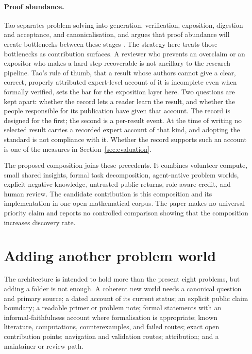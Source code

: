 \documentclass[10pt]{article}
\begin{document}
\paragraph{Proof abundance.}
Tao separates problem solving into generation, verification, exposition,
digestion and acceptance, and canonicalisation, and argues that proof
abundance will create bottlenecks between these stages \cite{tao2026}.  The
strategy here treats those bottlenecks as contribution surfaces.  A reviewer
who prevents an overclaim or an expositor who makes a hard step recoverable is
not ancillary to the research pipeline.  Tao's rule of thumb, that a result
whose authors cannot give a clear, correct, properly attributed expert-level
account of it is incomplete even when formally verified, sets the bar for the
exposition layer here.  Two questions are kept apart: whether the record lets a
reader learn the result, and whether the people responsible for its
publication have given that account.  The record is designed for the first;
the second is a per-result event.  At the time of writing no selected result
carries a recorded expert account of that kind, and adopting the standard is
not compliance with it.  Whether the record supports such an account is one of
the measures in Section~\ref{sec:evaluation}.

The proposed composition joins these precedents.  It combines volunteer
compute, small shared insights, formal task decomposition, agent-native
problem worlds, explicit negative knowledge, untrusted public returns,
role-aware credit, and human review.  The candidate contribution is this
composition and its implementation in one open mathematical corpus.  The
paper makes no universal priority claim and reports no controlled comparison
showing that the composition increases discovery rate.

\section{Adding another problem world}\label{sec:add-problem}

The architecture is intended to hold more than the present eight problems,
but adding a folder is not enough.  A coherent new world needs a canonical
question and primary source; a dated account of its current status; an explicit
public claim boundary; a readable primer or problem note; formal statements
with an informal-faithfulness account where formalisation is appropriate;
known literature, computations, counterexamples, and failed routes; exact open
contribution points; navigation and validation routes; attribution; and a
maintainer or review path.
\end{document}
